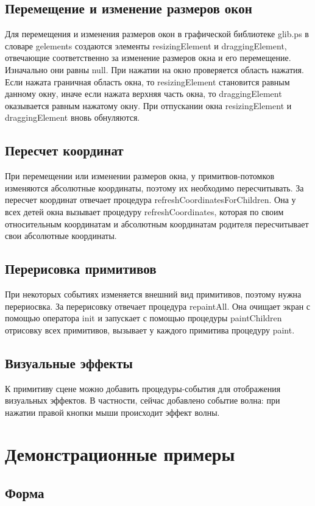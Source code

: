 \documentclass[14pt]{extarticle}
\begin{document}
	\subsection{Перемещение и изменение размеров окон}
	Для перемещения и изменения размеров окон в графической библиотеке glib.ps в словаре gelements создаются элементы resizingElement и  draggingElement, отвечающие соответственно за изменение размеров окна и  его перемещение. Изначально они равны null. При нажатии на окно проверяется область нажатия. Если нажата граничная область окна, то resizingElement становится равным данному окну, иначе если нажата верхняя часть окна, то draggingElement оказывается равным нажатому окну. При отпускании окна resizingElement и draggingElement вновь обнуляются.
	
	\subsection{Пересчет координат}
При перемещении или изменении размеров окна, у примитвов-потомков изменяются абсолютные координаты, поэтому их необходимо пересчитывать. За пересчет координат отвечает процедура refreshCoordinatesForChildren. Она у всех детей окна вызывает процедуру refreshCoordinates, которая по своим относительным координатам и абсолютным координатам родителя пересчитывает свои абсолютные координаты. 

\subsection{Перерисовка примитивов}
При некоторых событиях изменяется внешний вид примитивов, поэтому нужна перериосвка. За перерисовку отвечает процедура repaintAll. Она очищает экран с помощью оператора init и запускает с помощью процедуры paintChildren отрисовку всех примитивов, вызывает у каждого примитива процедуру paint. 
		
	\subsection{Визуальные эффекты}
	К примитиву сцене можно добавить процедуры-события для отображения визуальных эффектов. В частности, сейчас добавлено событие волна: при нажатии правой кнопки мыши происходит эффект волны. 
	\pagebreak
	\section{Демонстрационные примеры}
	\subsection{Форма}
	
\end{document}
